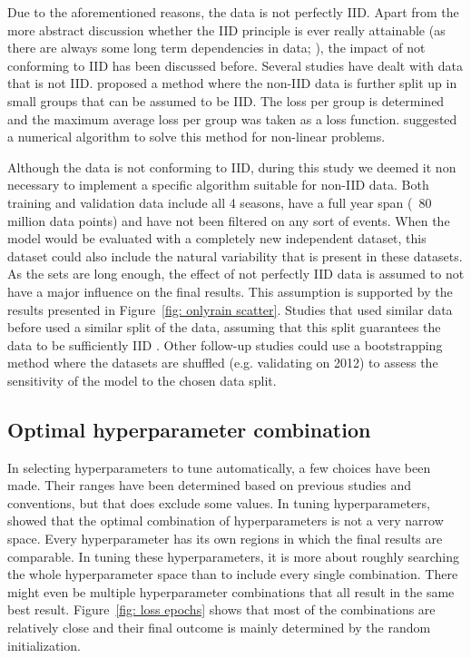 \documentclass[twocolumn, 10pt, a4paper]{memoir}
\begin{document}
	Due to the aforementioned reasons, the data is not perfectly IID. Apart from the more abstract discussion whether the IID principle is ever really attainable (as there are always some long term dependencies in data; ), the impact of not conforming to IID has been discussed before. Several studies have dealt with data that is not IID.  proposed a method where the non-IID data is further split up in small groups that can be assumed to be IID. The loss per group is determined and the maximum average loss per group was taken as a loss function.  suggested a numerical algorithm to solve this method for non-linear problems.
	
	Although the data is not conforming to IID, during this study we deemed it non necessary to implement a specific algorithm suitable for non-IID data. Both training and validation data include all 4 seasons, have a full year span (~80 million data points) and have not been filtered on any sort of events. When the model would be evaluated with a completely new independent dataset, this dataset could also include the natural variability that is present in these datasets. As the sets are long enough, the effect of not perfectly IID data is assumed to not have a major influence on the final results. This assumption is supported by the results presented in Figure~\ref{fig: onlyrain scatter}. Studies that used similar data before used a similar split of the data, assuming that this split guarantees the data to be sufficiently IID \cite{Diba2021,Pudashine2020}. Other follow-up studies could use a bootstrapping method where the datasets are shuffled (e.g. validating on 2012) to assess the sensitivity of the model to the chosen data split. 
	

	
	
	\subsection{Optimal hyperparameter combination} \label{sec: Equifinality}
	In selecting hyperparameters to tune automatically, a few choices have been made. Their ranges have been determined based on previous studies and conventions, but that does exclude some values. In tuning hyperparameters,  showed that the optimal combination of hyperparameters is not a very narrow space. Every hyperparameter has its own regions in which the final results are comparable. In tuning these hyperparameters, it is more about roughly searching the whole hyperparameter space than to include every single combination. There might even be multiple hyperparameter combinations that all result in the same best result. Figure~\ref{fig: loss epochs} shows that most of the combinations are relatively close and their final outcome is mainly determined by the random initialization. 
	
\end{document}
